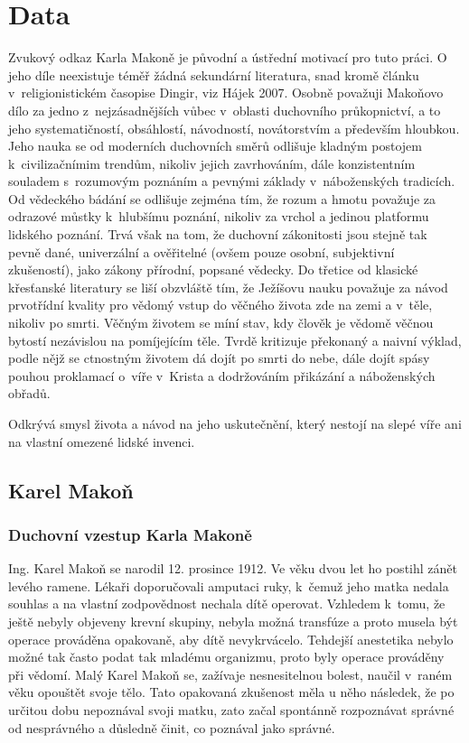 \chapter{Data}
\label{kap:data}

Zvukový odkaz Karla Makoně je původní a ústřední motivací pro tuto práci. O jeho
díle neexistuje téměř žádná sekundární literatura, snad kromě článku
v~religionistickém časopise Dingir, viz Hájek 2007\cite{hajek2007cesky}. Osobně
považuji Makoňovo dílo za jedno z~nejzásadnějších vůbec v~oblasti duchovního
průkopnictví, a to jeho systematičností, obsáhlostí, návodností, novátorstvím a
především hloubkou. Jeho nauka se od moderních duchovních směrů odlišuje kladným
postojem k~civilizačnímim trendům, nikoliv jejich zavrhováním, dále
konzistentním souladem s~rozumovým poznáním a pevnými základy v~náboženských
tradicích. Od vědeckého bádání se odlišuje zejména tím, že rozum a hmotu
považuje za odrazové můstky k~hlubšímu poznání, nikoliv za vrchol a jedinou
platformu lidského poznání. Trvá však na tom, že duchovní zákonitosti jsou
stejně tak pevně dané, univerzální a ověřitelné (ovšem pouze osobní, subjektivní
zkušeností), jako zákony přírodní, popsané vědecky. Do třetice od klasické
křesťanské literatury se liší obzvláště tím, že Ježíšovu nauku považuje za návod
prvotřídní kvality pro vědomý vstup do věčného života zde na zemi a v~těle,
nikoliv po smrti. Věčným životem se míní stav, kdy člověk je vědomě věčnou
bytostí nezávislou na pomíjejícím těle. Tvrdě kritizuje překonaný a naivní
výklad, podle nějž se ctnostným životem dá dojít po smrti do nebe, dále dojít
spásy pouhou proklamací o~víře v~Krista a dodržováním přikázání a náboženských
obřadů.

Odkrývá smysl života a návod na jeho uskutečnění, který nestojí na slepé víře
ani na vlastní omezené lidské invenci.

\section{Karel Makoň}

\subsection{Duchovní vzestup Karla Makoně}

Ing. Karel Makoň se narodil 12. prosince 1912. Ve věku dvou let ho postihl zánět
levého ramene. Lékaři doporučovali amputaci ruky, k~čemuž jeho matka nedala
souhlas a na vlastní zodpovědnost nechala dítě operovat. Vzhledem k~tomu, že
ještě nebyly objeveny krevní skupiny, nebyla možná transfúze a proto musela být
operace prováděna opakovaně, aby dítě nevykrvácelo. Tehdejší anestetika nebylo
možné tak často podat tak mladému organizmu, proto byly operace prováděny při
vědomí. Malý Karel Makoň se, zažívaje nesnesitelnou bolest, naučil v~raném věku
opouštět svoje tělo. Tato opakovaná zkušenost měla u něho následek, že po
určitou dobu nepoznával svoji matku, zato začal spontánně rozpoznávat správné od
nesprávného a důsledně činit, co poznával jako správné.

